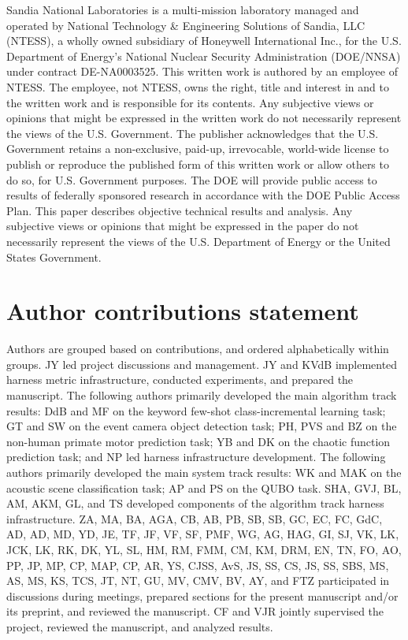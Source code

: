 Sandia National Laboratories is a multi-mission laboratory managed and operated by National Technology \& Engineering Solutions of Sandia, LLC (NTESS), a wholly owned subsidiary of Honeywell International Inc., for the U.S. Department of Energy’s National Nuclear Security Administration (DOE/NNSA) under contract DE-NA0003525. This written work is authored by an employee of NTESS. The employee, not NTESS, owns the right, title and interest in and to the written work and is responsible for its contents. Any subjective views or opinions that might be expressed in the written work do not necessarily represent the views of the U.S. Government. The publisher acknowledges that the U.S. Government retains a non-exclusive, paid-up, irrevocable, world-wide license to publish or reproduce the published form of this written work or allow others to do so, for U.S. Government purposes. The DOE will provide public access to results of federally sponsored research in accordance with the DOE Public Access Plan. This paper describes objective technical results and analysis. Any subjective views or opinions that might be expressed in the paper do not necessarily represent the views of the U.S. Department of Energy or the United States Government.

\section*{Author contributions statement}
Authors are grouped based on contributions, and ordered alphabetically within groups.
JY led project discussions and management. JY and KVdB implemented harness metric infrastructure, conducted experiments, and prepared the manuscript.
The following authors primarily developed the main algorithm track results: DdB and MF on the keyword few-shot class-incremental learning task; GT and SW on the event camera object detection task; PH, PVS and BZ on the non-human primate motor prediction task; YB and DK on the chaotic function prediction task; and NP led harness infrastructure development. The following authors primarily developed the main system track results: WK and MAK on the acoustic scene classification task; AP and PS on the QUBO task.
SHA, GVJ, BL, AM, AKM, GL, and TS developed components of the algorithm track harness infrastructure.
ZA, MA, BA, AGA, CB, AB, PB, SB, SB, GC, EC, FC, GdC, AD, AD, MD, YD, JE, TF, JF, VF, SF, PMF, WG, AG, HAG, GI, SJ, VK, LK, JCK, LK, RK, DK, YL, SL, HM, RM, FMM, CM, KM, DRM, EN, TN, FO, AO, PP, JP, MP, CP, MAP, CP, AR, YS, CJSS, AvS, JS, SS, CS, JS, SS, SBS, MS, AS, MS, KS, TCS, JT, NT, GU, MV, CMV, BV, AY, and FTZ participated in discussions during meetings, prepared sections for the present manuscript and/or its preprint, and reviewed the manuscript.
CF and VJR jointly supervised the project, reviewed the manuscript, and analyzed results.

